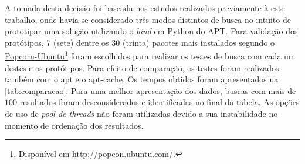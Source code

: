 
A tomada desta decisão foi baseada nos estudos realizados previamente à este trabalho, onde havia-se considerado três modos distintos de busca no intuito de prototipar uma solução utilizando o \textit{bind} em Python do {\code APT}.
Para validação dos protótipos, 7 (sete) dentre os 30 (trinta) pacotes mais instalados segundo o \href{http://popcon.ubuntu.com/}{Popcorn-Ubuntu}\footnote{Disponível em \url{http://popcon.ubuntu.com/}.} foram escolhidos para realizar os testes de busca com cada um destes e os protótipos. Para efeito de comparação, os testes foram realizados também com o {\code apt} e o {\code apt-cache}. Os tempos obtidos foram apresentados na \autoref{tab:comparacao}. Para uma melhor apresentação dos dados, buscas com mais de $100$  resultados foram desconsiderados e identificadas no final da tabela. As opções de uso de \textit{pool de threads} não foram utilizadas devido a sua instabilidade no momento de ordenação dos resultados.

